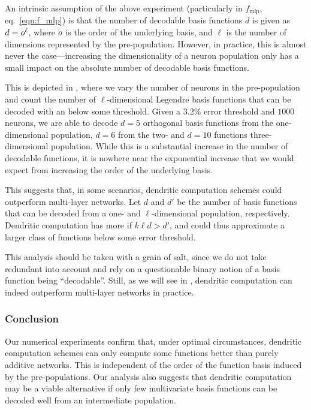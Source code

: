 An intrinsic assumption of the above experiment (particularly in $f_\mathrm{mlp}$, eq.~\ref{eqn:f_mlp}) is that the number of decodable basis functions $d$ is given as $d = o^\ell$, where $o$ is the order of the underlying basis, and $\ell$ is the number of dimensions represented by the pre-population.
However, in practice, this is almost never the case---increasing the dimensionality of a neuron population only has a small impact on the absolute number of decodable basis functions.

This is depicted in , where we vary the number of neurons in the pre-population and count the number of $\ell$-dimensional Legendre basis functions that can be decoded with an \NRMSE below some threshold.
Given a $3.2\%$ error threshold and $1000$ neurons, we are able to decode $d = 5$ orthogonal basis functions from the one-dimensional population, $d = 6$ from the two- and $d = 10$ functions three-dimensional population.
While this is a substantial increase in the number of decodable functions, it is nowhere near the exponential increase that we would expect from increasing the order of the underlying basis.

This suggests that, in some scenarios, dendritic computation schemes could outperform multi-layer networks.
Let $d$ and $d'$ be the number of basis functions that can be decoded from a one- and $\ell$-dimensional population, respectively.
Dendritic computation has more \DOF if $k \ell d > d'$, and could thus approximate a larger class of functions below some error threshold.

This analysis should be taken with a grain of salt, since we do not take redundant \DOF into account and rely on a questionable binary notion of a basis function being \enquote{decodable}.
Still, as we will see in , dendritic computation can indeed outperform multi-layer networks in practice.

\subsubsection{Conclusion}
Our numerical experiments confirm that, under optimal circumstances, dendritic computation schemes can only compute some functions better than purely additive networks.
This is independent of the order of the function basis induced by the pre-populations.
Our analysis also suggests that dendritic computation may be a viable alternative if only few multivariate basis functions can be decoded well from an intermediate population.
